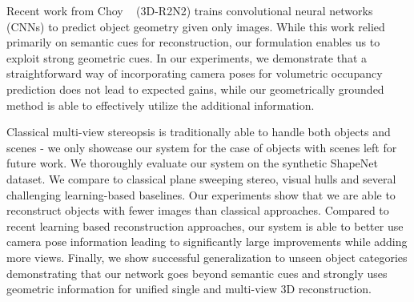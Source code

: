 \documentclass[../thesis.tex]{subfiles}
\begin{document}
Recent work from Choy \etal~\cite{choy20163d} (3D-R2N2) trains convolutional neural networks (CNNs) to predict object geometry given only images. While this work relied primarily on semantic cues for reconstruction, our formulation enables us to exploit strong geometric cues. In our experiments, we demonstrate that a straightforward way of incorporating camera poses for volumetric occupancy prediction does not lead to expected gains, while our geometrically grounded method is able to effectively utilize the additional information.

Classical multi-view stereopsis is traditionally able to handle both objects and scenes - we only showcase our system for the case of objects with scenes left for future work. We thoroughly evaluate our system on the synthetic ShapeNet~\cite{shapenet2015} dataset. We compare to classical plane sweeping stereo, visual hulls and several challenging learning-based baselines. Our experiments show that we are able to reconstruct objects with fewer images than classical approaches. Compared to recent learning based reconstruction approaches, our system is able to better use camera pose information leading to significantly large improvements while adding more views. Finally, we show successful generalization to unseen object categories demonstrating that our network goes beyond semantic cues and strongly uses geometric information for unified single and multi-view 3D reconstruction.


\end{document}
